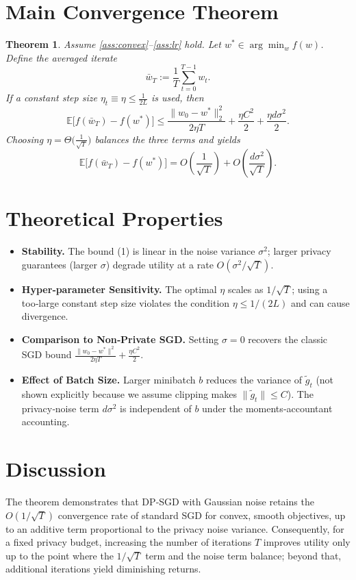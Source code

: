 \documentclass{article}
\newtheorem{theorem}{Theorem}
\newcommand{\E}{\mathbb{E}}
\begin{document}
\section*{Main Convergence Theorem}
\begin{theorem}\label{thm:conv}
Assume \ref{ass:convex}–\ref{ass:lr} hold.  Let $w^{*}\in\arg\min_{w}f(w)$.  Define the averaged iterate
\[
\bar w_T:=\frac{1}{T}\sum_{t=0}^{T-1}w_t .
\]
If a constant step size $\eta_t\equiv\eta\le\frac{1}{2L}$ is used, then
\[
\boxed{
\E\!\big[f(\bar w_T)-f(w^{*})\big]\le
\frac{\|w_0-w^{*}\|_2^{2}}{2\eta T}
+\frac{\eta C^{2}}{2}
+\frac{\eta d\sigma^{2}}{2}
}.
\tag{1}
\]
Choosing $\eta=\Theta\!\big(\frac{1}{\sqrt{T}}\big)$ balances the three terms and yields
\[
\E\!\big[f(\bar w_T)-f(w^{*})\big]=O\!\left(\frac{1}{\sqrt{T}}\right)+O\!\left(\frac{d\sigma^{2}}{\sqrt{T}}\right).
\]
\end{theorem}

\section*{Theoretical Properties}
\begin{itemize}[leftmargin=*]
\item \textbf{Stability.} The bound (1) is linear in the noise variance $\sigma^{2}$; larger privacy guarantees (larger $\sigma$) degrade utility at a rate $O(\sigma^{2}/\sqrt{T})$.
\item \textbf{Hyper‑parameter Sensitivity.} The optimal $\eta$ scales as $1/\sqrt{T}$; using a too‑large constant step size violates the condition $\eta\le 1/(2L)$ and can cause divergence.
\item \textbf{Comparison to Non‑Private SGD.} Setting $\sigma=0$ recovers the classic SGD bound $\frac{\|w_0-w^{*}\|^{2}}{2\eta T}+\frac{\eta C^{2}}{2}$.
\item \textbf{Effect of Batch Size.} Larger minibatch $b$ reduces the variance of $\tilde g_t$ (not shown explicitly because we assume clipping makes $\|\tilde g_t\|\le C$).  The privacy‑noise term $d\sigma^{2}$ is independent of $b$ under the moments‑accountant accounting.
\end{itemize}

\section*{Discussion}
The theorem demonstrates that DP‑SGD with Gaussian noise retains the $O(1/\sqrt{T})$ convergence rate of standard SGD for convex, smooth objectives, up to an additive term proportional to the privacy noise variance.  Consequently, for a fixed privacy budget, increasing the number of iterations $T$ improves utility only up to the point where the $1/\sqrt{T}$ term and the noise term balance; beyond that, additional iterations yield diminishing returns.
\end{document}
